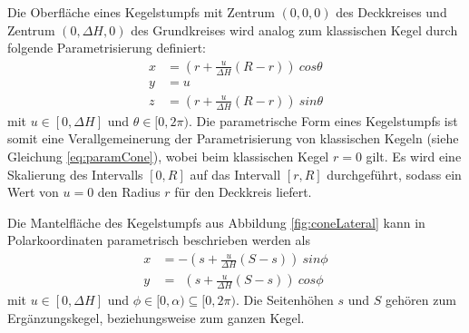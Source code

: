 Die Oberfläche eines Kegelstumpfs mit Zentrum $(0,0,0)$ des Deckkreises und Zentrum $(0,\Delta H, 0)$ des Grundkreises wird analog zum klassischen Kegel durch folgende Parametrisierung definiert:
\begin{equation} \label{eq:paramFrustum}
\begin{aligned}
x &= (r + \frac{u}{\Delta H} (R - r))~cos \theta \\
y &= u \\
z &= (r + \frac{u}{\Delta H} (R - r))~sin \theta
\end{aligned}
\end{equation}
mit $u\in [0, \Delta H]$ und $\theta \in [0, 2\pi)$. Die parametrische Form eines Kegelstumpfs ist somit eine Verallgemeinerung der Parametrisierung von klassischen Kegeln (siehe Gleichung \ref{eq:paramCone}), wobei beim klassischen Kegel $r = 0$ gilt. Es wird eine Skalierung des Intervalls $[0, R]$ auf das Intervall $[r, R]$ durchgeführt, sodass ein Wert von $u = 0$ den Radius $r$ für den Deckkreis liefert.

Die Mantelfläche des Kegelstumpfs aus Abbildung \ref{fig:coneLateral} kann in Polarkoordinaten parametrisch beschrieben werden als
\begin{equation} \label{eq:paramLateral}
\begin{aligned}
x &= -(s + \frac{u}{\Delta H}(S-s)) ~sin \phi \\
y &= ~~(s + \frac{u}{\Delta H} (S-s)) ~cos \phi
\end{aligned}
\end{equation}
mit  $u\in [0, \Delta H]$ und $\phi \in [0, \alpha) \subseteq [0, 2\pi)$. Die Seitenhöhen $s$ und $S$ gehören zum Ergänzungskegel, beziehungsweise zum ganzen Kegel.

